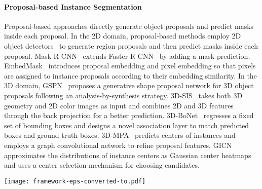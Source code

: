 \documentclass[10pt,twocolumn,letterpaper]{article}
\newcommand{\thename}{HAIS}
\begin{document}
\paragraph{Proposal-based Instance Segmentation}
Proposal-based approaches directly generate object proposals and predict masks inside each proposal.
In the 2D domain, proposal-based methods employ 2D object detectors~\cite{FastRCNN,FasterRCNN,RFCN,FPN} to generate region proposals and then predict masks inside each proposal. Mask R-CNN~\cite{MaskRCNN} extends Faster R-CNN~\cite{FasterRCNN} by adding a mask prediction. 
EmbedMask~\cite{EmbedMask} introduces proposal embedding and pixel embedding so that pixels are assigned to instance proposals according to their embedding similarity.
In the 3D domain, GSPN~\cite{GSPN} proposes a generative shape proposal network for 3D object proposals following an analysis-by-synthesis strategy. 3D-SIS~\cite{3DSIS} takes both 3D geometry and 2D color images as input and combines 2D and 3D features through the back projection for a better prediction. 
3D-BoNet~\cite{BoNet} regresses a fixed set of bounding boxes and designs a novel association layer to match predicted boxes and ground truth boxes.
3D-MPA~\cite{3D-MPA} predicts centers of instances and employs a graph convolutional network to refine proposal features.
GICN~\cite{GICN} approximates the distributions of instance centers as Gaussian center heatmaps and uses a center selection mechanism for choosing candidates.


\begin{figure*}[htb]
\centering
\texttt{[image: framework-eps-converted-to.pdf]}
\caption{The framework of \thename. For the input point cloud, our method first employs 3D UNet-like structure with submanifold sparse convolution~\cite{UNet,Submanifold} for point-wise feature learning. Then, we use the spatial constraint of points to perform point aggregation with fixed bandwidth. Based on point aggregation results, set aggregation with dynamic bandwidth is performed to form instance proposals. The intra-instance prediction is designed for outlier filtering and mask quality scoring.}
\label{fig:framework}
\end{figure*}
\end{document}
